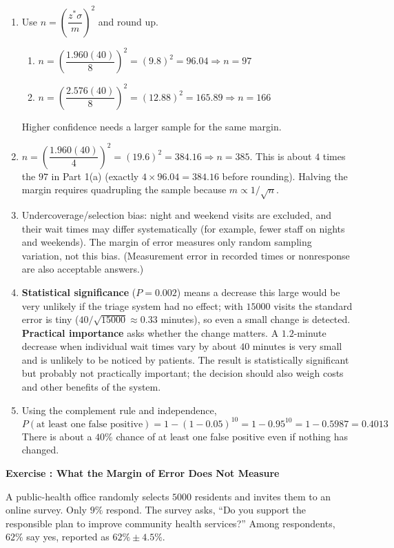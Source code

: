 \documentclass[11pt]{article}
\newcounter{exercise}
\newcommand{\exercise}[1]{%
  \par\medskip
  \refstepcounter{exercise}%
  {\large\bfseries\color{CourseBlue} Exercise \theexercise: #1}\par\smallskip}
\begin{document}
\begin{solution}
\begin{enumerate}
  \item Use $n=\left(\dfrac{z^*\sigma}{m}\right)^2$ and round up.
  \begin{enumerate}[label=(\alph*)]
    \item $n=\left(\dfrac{1.960(40)}{8}\right)^2=(9.8)^2=96.04\Rightarrow\boxed{n=97}$
    \item $n=\left(\dfrac{2.576(40)}{8}\right)^2=(12.88)^2=165.89\Rightarrow\boxed{n=166}$
  \end{enumerate}
  Higher confidence needs a larger sample for the same margin.
  \item $n=\left(\dfrac{1.960(40)}{4}\right)^2=(19.6)^2=384.16\Rightarrow\boxed{n=385}$. This is about $4$ times the $97$ in Part 1(a) (exactly $4\times96.04=384.16$ before rounding). Halving the margin requires quadrupling the sample because $m\propto1/\sqrt n$.
  \item Undercoverage/selection bias: night and weekend visits are excluded, and their wait times may differ systematically (for example, fewer staff on nights and weekends). The margin of error measures only random sampling variation, not this bias. (Measurement error in recorded times or nonresponse are also acceptable answers.)
  \item \textbf{Statistical significance} ($P=0.002$) means a decrease this large would be very unlikely if the triage system had no effect; with $15000$ visits the standard error is tiny ($40/\sqrt{15000}\approx0.33$ minutes), so even a small change is detected. \textbf{Practical importance} asks whether the change matters. A $1.2$-minute decrease when individual wait times vary by about $40$ minutes is very small and is unlikely to be noticed by patients. The result is statistically significant but probably not practically important; the decision should also weigh costs and other benefits of the system.
  \item Using the complement rule and independence,
  \[
  P(\text{at least one false positive})=1-(1-0.05)^{10}=1-0.95^{10}=1-0.5987=0.4013
  \]
  There is about a $40\%$ chance of at least one false positive even if nothing has changed.
\end{enumerate}
\end{solution}

\exercise{What the Margin of Error Does Not Measure}

A public-health office randomly selects $5000$ residents and invites them to an online survey. Only $9\%$ respond. The survey asks, ``Do you support the responsible plan to improve community health services?'' Among respondents, $62\%$ say yes, reported as $62\%\pm4.5\%$.
\end{document}
